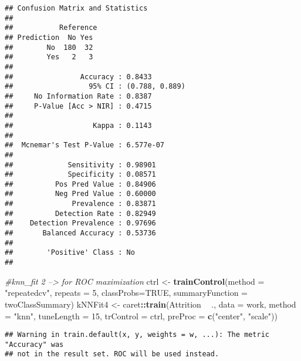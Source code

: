 \documentclass[]{article}
\newenvironment{Shaded}{\begin{snugshade}}{\end{snugshade}}
\newcommand{\CommentTok}[1]{\textcolor[rgb]{0.56,0.35,0.01}{\textit{#1}}}
\newcommand{\DataTypeTok}[1]{\textcolor[rgb]{0.13,0.29,0.53}{#1}}
\newcommand{\DecValTok}[1]{\textcolor[rgb]{0.00,0.00,0.81}{#1}}
\newcommand{\KeywordTok}[1]{\textcolor[rgb]{0.13,0.29,0.53}{\textbf{#1}}}
\newcommand{\NormalTok}[1]{#1}
\newcommand{\OperatorTok}[1]{\textcolor[rgb]{0.81,0.36,0.00}{\textbf{#1}}}
\newcommand{\OtherTok}[1]{\textcolor[rgb]{0.56,0.35,0.01}{#1}}
\newcommand{\StringTok}[1]{\textcolor[rgb]{0.31,0.60,0.02}{#1}}
\begin{document}
\begin{verbatim}
## Confusion Matrix and Statistics
## 
##           Reference
## Prediction  No Yes
##        No  180  32
##        Yes   2   3
##                                         
##                Accuracy : 0.8433        
##                  95% CI : (0.788, 0.889)
##     No Information Rate : 0.8387        
##     P-Value [Acc > NIR] : 0.4715        
##                                         
##                   Kappa : 0.1143        
##                                         
##  Mcnemar's Test P-Value : 6.577e-07     
##                                         
##             Sensitivity : 0.98901       
##             Specificity : 0.08571       
##          Pos Pred Value : 0.84906       
##          Neg Pred Value : 0.60000       
##              Prevalence : 0.83871       
##          Detection Rate : 0.82949       
##    Detection Prevalence : 0.97696       
##       Balanced Accuracy : 0.53736       
##                                         
##        'Positive' Class : No            
## 
\end{verbatim}

\begin{Shaded}
\begin{Highlighting}[]
\CommentTok{#knn_fit 2 --> for ROC maximization}
\NormalTok{ctrl <-}\StringTok{ }\KeywordTok{trainControl}\NormalTok{(}\DataTypeTok{method =} \StringTok{"repeatedcv"}\NormalTok{, }\DataTypeTok{repeats =} \DecValTok{5}\NormalTok{, }\DataTypeTok{classProbs=}\OtherTok{TRUE}\NormalTok{, }\DataTypeTok{summaryFunction =}\NormalTok{ twoClassSummary)}
\NormalTok{kNNFit4 <-}\StringTok{ }\NormalTok{caret}\OperatorTok{::}\KeywordTok{train}\NormalTok{(Attrition }\OperatorTok{~}\StringTok{ }\NormalTok{., }
                \DataTypeTok{data =}\NormalTok{ work,}
                \DataTypeTok{method =} \StringTok{"knn"}\NormalTok{,}
                \DataTypeTok{tuneLength =} \DecValTok{15}\NormalTok{,}
                \DataTypeTok{trControl =}\NormalTok{ ctrl,}
                \DataTypeTok{preProc =} \KeywordTok{c}\NormalTok{(}\StringTok{"center"}\NormalTok{, }\StringTok{"scale"}\NormalTok{))}
\end{Highlighting}
\end{Shaded}

\begin{verbatim}
## Warning in train.default(x, y, weights = w, ...): The metric "Accuracy" was
## not in the result set. ROC will be used instead.
\end{verbatim}
\end{document}
